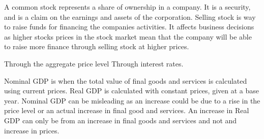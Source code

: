 \documentclass[12pt]{examnotes}
\begin{document}
\ra A common stock represents a share of ownership in a company. 
\ra It is a security, and is a claim on the earnings and assets of the corporation. 
\ra Selling stock is way to raise funds for financing the companies activities.
\ra It affects business decisions as higher stocks prices in the stock market mean that the company will be able to raise more finance through selling stock at higher prices. 

 Through the aggregate price level 
 Through interest rates. 

\ra Nominal GDP is when the total value of final goods and services is calculated using current prices. \ra Real GDP is calculated with constant prices, given at a base year. 
\ra Nominal GDP can be misleading as an increase could be due to a rise in the price level or an actual increase in final good and services. 
\ra An increase in Real GDP can only be from an increase in final goods and services and not and increase in prices. 

\end{document}
